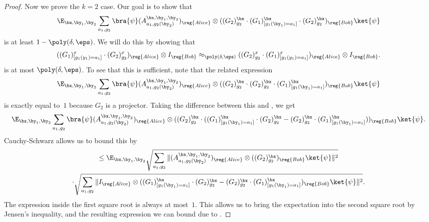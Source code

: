 \begin{proof}
Now we prove the $k = 2$ case.
Our goal is to show that
\begin{equation}\label{eq:food-rakes}
\E_{\bx, \by_1, \by_2} \sum_{a_1, g_2} \bra{\psi} (A^{\bx, \by_1, \by_2}_{a_1, g_2(\by_2)})_{\reg{Alice}}
\otimes ((G_2)^{\bx}_{g_2} \cdot (G_1)^{\bx}_{[g_1(\by_1) = a_1]} \cdot (G_2)^{\bx}_{g_2})_{\reg{Bob}} \ket{\psi}
\end{equation}
is at least $1- \poly(\delta, \eps)$.
We will do this by showing that
\begin{equation}\label{eq:what-a-johnnie-wants}
((G_1)^x_{[g_1(y_1)=a_1]} \cdot (G_2)^x_{g_2})_{\reg{Alice}} \otimes I_{\reg{Bob}}
\approx_{\poly(\delta, \eps)} ((G_2)^x_{g_2} \cdot (G_1)^x_{[g_1(y_1)=a_1]})_{\reg{Alice}} \otimes I_{\reg{Bob}}.
\end{equation}
is at most $\poly(\delta, \eps)$.
To see that this is sufficient, note that the related expression
\begin{equation*}
\E_{\bx, \by_1, \by_2} \sum_{a_1, g_2} \bra{\psi} (A^{\bx, \by_1, \by_2}_{a_1, g_2(\by_2)})_{\reg{Alice}}
\otimes ((G_2)^{\bx}_{g_2} \cdot (G_2)^{\bx}_{g_2} \cdot (G_1)^{\bx}_{[g_1(\by_1) = a_1]})_{\reg{Bob}} \ket{\psi}
\end{equation*}
is exactly equal to~$1$ because $G_2$ is a projector.
Taking the difference between this and , we get
\begin{equation*}
\E_{\bx, \by_1, \by_2} \sum_{a_1, g_2} \bra{\psi} (A^{\bx, \by_1, \by_2}_{a_1, g_2(\by_2)})_{\reg{Alice}}
\otimes ((G_2)^{\bx}_{g_2} \cdot ((G_1)^{\bx}_{[g_1(\by_1) = a_1]} \cdot (G_2)^{\bx}_{g_2}- (G_2)^{\bx}_{g_2} \cdot (G_1)^{\bx}_{[g_1(\by_1) = a_1]}))_{\reg{Bob}} \ket{\psi}.
\end{equation*}
Cauchy-Schwarz allows us to bound this by
\begin{multline*}
\leq \E_{\bx, \by_1, \by_2} \sqrt{ \sum_{a_1, g_2}\Vert (A^{\bx, \by_1, \by_2}_{a_1, g_2(\by_2)})_{\reg{Alice}} \otimes ((G_2)^{\bx}_{g_2})_{\reg{Bob}} \ket{\psi} \Vert^2}\\
	\cdot \sqrt{ \sum_{a_1, g_2}\Vert I_{\reg{Alice}} \otimes ((G_1)^{\bx}_{[g_1(\by_1) = a_1]} \cdot (G_2)^{\bx}_{g_2}- (G_2)^{\bx}_{g_2} \cdot (G_1)^{\bx}_{[g_1(\by_1) = a_1]})_{\reg{Bob}} \ket{\psi} \Vert^2}.
\end{multline*}
The expression inside the first square root is always at most~$1$.
This allows us to bring the expectation into the second square root by Jensen's inequality,
and the resulting expression we can bound due to .


\end{proof}
